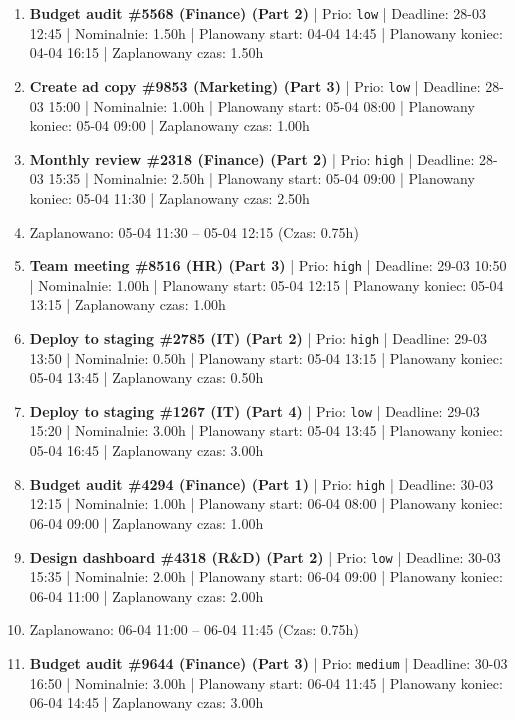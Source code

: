 {\begin{enumerate}
  \item [\textbf{14693}] \textbf{Budget audit \#5568 (Finance) (Part 2)} | Prio: \texttt{low} | Deadline: 28-03 12:45 | Nominalnie: 1.50h | Planowany start: 04-04 14:45 | Planowany koniec: 04-04 16:15 | Zaplanowany czas: 1.50h
  \item [\textbf{14679}] \textbf{Create ad copy \#9853 (Marketing) (Part 3)} | Prio: \texttt{low} | Deadline: 28-03 15:00 | Nominalnie: 1.00h | Planowany start: 05-04 08:00 | Planowany koniec: 05-04 09:00 | Zaplanowany czas: 1.00h
  \item [\textbf{14618}] \textbf{Monthly review \#2318 (Finance) (Part 2)} | Prio: \texttt{high} | Deadline: 28-03 15:35 | Nominalnie: 2.50h | Planowany start: 05-04 09:00 | Planowany koniec: 05-04 11:30 | Zaplanowany czas: 2.50h
  \item [\textbf{PRZERWA}] Zaplanowano: 05-04 11:30 -- 05-04 12:15 (Czas: 0.75h)
  \item [\textbf{14624}] \textbf{Team meeting \#8516 (HR) (Part 3)} | Prio: \texttt{high} | Deadline: 29-03 10:50 | Nominalnie: 1.00h | Planowany start: 05-04 12:15 | Planowany koniec: 05-04 13:15 | Zaplanowany czas: 1.00h
  \item [\textbf{14623}] \textbf{Deploy to staging \#2785 (IT) (Part 2)} | Prio: \texttt{high} | Deadline: 29-03 13:50 | Nominalnie: 0.50h | Planowany start: 05-04 13:15 | Planowany koniec: 05-04 13:45 | Zaplanowany czas: 0.50h
  \item [\textbf{14686}] \textbf{Deploy to staging \#1267 (IT) (Part 4)} | Prio: \texttt{low} | Deadline: 29-03 15:20 | Nominalnie: 3.00h | Planowany start: 05-04 13:45 | Planowany koniec: 05-04 16:45 | Zaplanowany czas: 3.00h
  \item [\textbf{14619}] \textbf{Budget audit \#4294 (Finance) (Part 1)} | Prio: \texttt{high} | Deadline: 30-03 12:15 | Nominalnie: 1.00h | Planowany start: 06-04 08:00 | Planowany koniec: 06-04 09:00 | Zaplanowany czas: 1.00h
  \item [\textbf{14691}] \textbf{Design dashboard \#4318 (R\&D) (Part 2)} | Prio: \texttt{low} | Deadline: 30-03 15:35 | Nominalnie: 2.00h | Planowany start: 06-04 09:00 | Planowany koniec: 06-04 11:00 | Zaplanowany czas: 2.00h
  \item [\textbf{PRZERWA}] Zaplanowano: 06-04 11:00 -- 06-04 11:45 (Czas: 0.75h)
  \item [\textbf{14659}] \textbf{Budget audit \#9644 (Finance) (Part 3)} | Prio: \texttt{medium} | Deadline: 30-03 16:50 | Nominalnie: 3.00h | Planowany start: 06-04 11:45 | Planowany koniec: 06-04 14:45 | Zaplanowany czas: 3.00h

\end{enumerate}}
